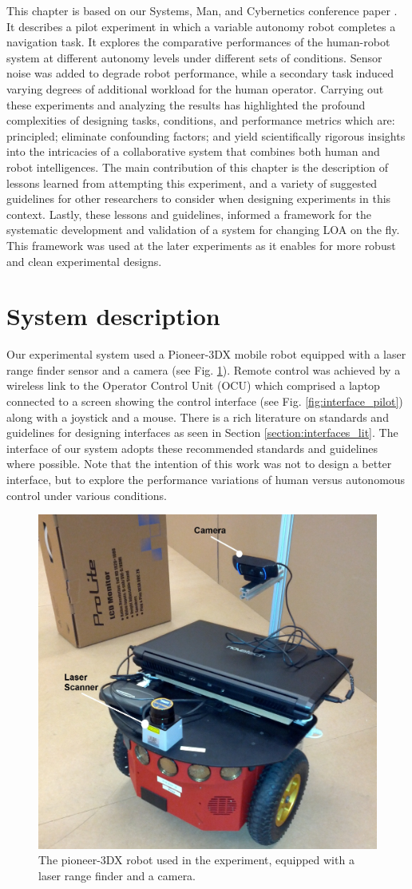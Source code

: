 \documentclass[a4paper,12pt,oneside,openright]{bhamthesis}
\begin{document}
This chapter is based on our Systems, Man, and Cybernetics conference paper \citep{Chiou2015}. It describes a pilot experiment in which a variable autonomy robot completes a navigation task. It explores the comparative performances of the human-robot system at different autonomy levels under different sets of conditions. Sensor noise was added to degrade robot performance, while a secondary task induced varying degrees of additional workload for the human operator. Carrying out these experiments and analyzing the results has highlighted the profound complexities of designing tasks, conditions, and performance metrics which are: principled; eliminate confounding factors; and yield scientifically rigorous insights into the intricacies of a collaborative system that combines both human and robot intelligences. The main contribution of this chapter is the description of lessons learned from attempting this experiment, and a variety of suggested guidelines for other researchers to consider when designing experiments in this context. Lastly, these lessons and guidelines, informed a framework for the systematic development and validation of a system for changing LOA on the fly. This framework was used at the later experiments as it enables for more robust and clean experimental designs.

\section{System description}\label{chapter3:system}
Our experimental system used a Pioneer-3DX mobile robot equipped with a laser range finder sensor and a camera (see Fig. \ref{fig:pioneer_exp1}). Remote control was achieved by a wireless link to the Operator Control Unit (OCU) which comprised a laptop connected to a screen showing the control interface (see Fig. \ref{fig:interface_pilot}) along with a joystick and a mouse. There is a rich literature on standards and guidelines for designing interfaces as seen in Section \ref{section:interfaces_lit}. The interface of our system adopts these recommended standards and guidelines where possible. Note that the intention of this work was not to design a better interface, but to explore the performance variations of human versus autonomous control under various conditions. 

\begin{figure}
	\centering
	\includegraphics[width=0.5\columnwidth]{chapter5_fig/pioneer.jpg}
	\caption{The pioneer-3DX robot used in the experiment, equipped with a laser range finder and a camera.}
	\label{fig:pioneer_exp1}
\end{figure}
\end{document}
